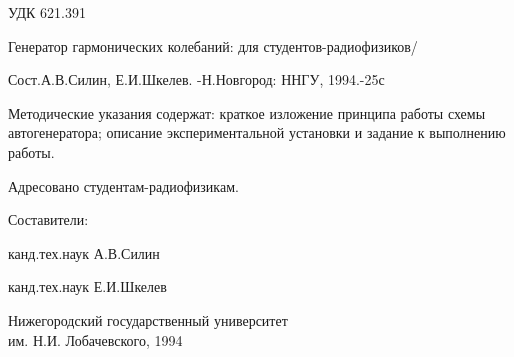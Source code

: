 \thispagestyle{empty}
УДК 621.391


Генератор гармонических колебаний: для студентов-радиофизиков/ 
\noindent

Сост.А.В.Силин, Е.И.Шкелев.
-Н.Новгород: ННГУ, 1994.-25с

\vfill
Методические указания содержат: краткое изложение принципа работы схемы автогенератора; описание экспериментальной установки и задание к выполнению работы.

Адресовано студентам-радиофизикам.
\vfill

\begin{center}
	Составители: 

	канд.тех.наук А.В.Силин
	
	канд.тех.наук Е.И.Шкелев

	
\end{center}
\vfill
\begin{flushleft}
Нижегородский государственный университет \\
им. Н.И. Лобачевского, 1994
\end{flushleft}
\newpage